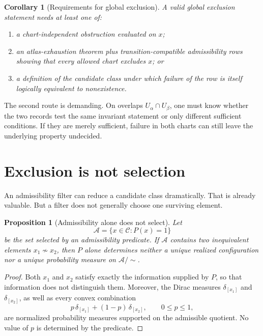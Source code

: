 \documentclass[11pt]{article}
\newtheorem{proposition}[theorem]{Proposition}
\newtheorem{corollary}[theorem]{Corollary}
\theoremstyle{definition}
\theoremstyle{remark}
\newcommand{\cA}{\mathcal A}
\newcommand{\cC}{\mathcal C}
\newcommand{\1}{\mathbf 1}
\begin{document}
\begin{corollary}[Requirements for global exclusion]
\label{cor:global}
A valid global exclusion statement needs at least one of:
\begin{enumerate}[leftmargin=2em]
\item a chart-independent obstruction evaluated on \(x\);
\item an atlas-exhaustion theorem plus transition-compatible admissibility
      rows showing that every allowed chart excludes \(x\); or
\item a definition of the candidate class under which failure of the row
      is itself logically equivalent to nonexistence.
\end{enumerate}
\end{corollary}

The second route is demanding.  On overlaps \(U_\alpha\cap U_\beta\), one
must know whether the two records test the same invariant statement or
only different sufficient conditions.  If they are merely sufficient,
failure in both charts can still leave the underlying property undecided.

\section{Exclusion is not selection}
\label{sec:selection}

An admissibility filter can reduce a candidate class dramatically.  That
is already valuable.  But a filter does not generally choose one surviving
element.

\begin{proposition}[Admissibility alone does not select]
\label{prop:noselect}
Let
\[
  \cA=\{x\in\cC:P(x)=1\}
\]
be the set selected by an admissibility predicate.  If \(\cA\) contains
two inequivalent elements \(x_1\not\sim x_2\), then \(P\) alone determines
neither a unique realized configuration nor a unique probability measure
on \(\cA/\!\sim\).
\end{proposition}

\begin{proof}
Both \(x_1\) and \(x_2\) satisfy exactly the information supplied by
\(P\), so that information does not distinguish them.  Moreover, the
Dirac measures \(\delta_{[x_1]}\) and \(\delta_{[x_2]}\), as well as every
convex combination
\[
  p\,\delta_{[x_1]}+(1-p)\,\delta_{[x_2]},
  \qquad 0\leq p\leq1,
\]
are normalized probability measures supported on the admissible quotient.
No value of \(p\) is determined by the predicate.
\end{proof}
\end{document}
